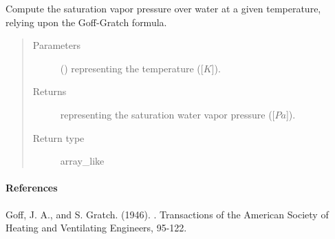 \documentclass[letterpaper,10pt,english]{sphinxmanual}
\begin{document}
\begin{fulllineitems}
\label{\detokenize{api:utils.utils_meteo.apply_goff_gratch_formula}}
Compute the saturation vapor pressure over water at a given temperature, relying upon the Goff-Gratch formula.
\begin{quote}\begin{description}
\item[{Parameters}] \leavevmode
{} () \textendash{}  representing the temperature ({[}\(K\){]}).

\item[{Returns}] \leavevmode
{} representing the saturation water vapor pressure ({[}\(Pa\){]}).

\item[{Return type}] \leavevmode
array\_like

\end{description}\end{quote}
\paragraph{References}

Goff, J. A., and S. Gratch. (1946). .              Transactions of the American Society of Heating and Ventilating Engineers, 95-122.

\end{fulllineitems}

\end{document}
